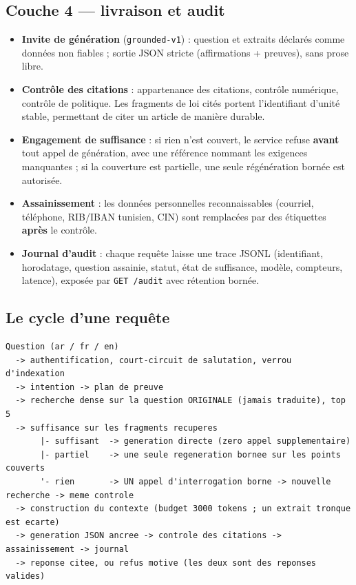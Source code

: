 \documentclass[a4paper,12pt]{report}
\begin{document}
\subsection{Couche 4 — livraison et audit}
\begin{itemize}
  \item \textbf{Invite de génération} (\texttt{grounded-v1}) : question et extraits déclarés comme
        données non fiables ; sortie JSON stricte (affirmations + preuves), sans prose libre.
  \item \textbf{Contrôle des citations} : appartenance des citations, contrôle numérique, contrôle
        de politique. Les fragments de loi cités portent l'identifiant d'unité stable, permettant
        de citer un article de manière durable.
  \item \textbf{Engagement de suffisance} : si rien n'est couvert, le service refuse \textbf{avant}
        tout appel de génération, avec une référence nommant les exigences manquantes ; si la
        couverture est partielle, une seule régénération bornée est autorisée.
  \item \textbf{Assainissement} : les données personnelles reconnaissables (courriel, téléphone,
        RIB/IBAN tunisien, CIN) sont remplacées par des étiquettes \textbf{après} le contrôle.
  \item \textbf{Journal d'audit} : chaque requête laisse une trace JSONL (identifiant, horodatage,
        question assainie, statut, état de suffisance, modèle, compteurs, latence), exposée par
        \texttt{GET /audit} avec rétention bornée.
\end{itemize}

\subsection{Le cycle d'une requête}
\begin{verbatim}
Question (ar / fr / en)
  -> authentification, court-circuit de salutation, verrou d'indexation
  -> intention -> plan de preuve
  -> recherche dense sur la question ORIGINALE (jamais traduite), top 5
  -> suffisance sur les fragments recuperes
       |- suffisant  -> generation directe (zero appel supplementaire)
       |- partiel    -> une seule regeneration bornee sur les points couverts
       '- rien       -> UN appel d'interrogation borne -> nouvelle recherche -> meme controle
  -> construction du contexte (budget 3000 tokens ; un extrait tronque est ecarte)
  -> generation JSON ancree -> controle des citations -> assainissement -> journal
  -> reponse citee, ou refus motive (les deux sont des reponses valides)
\end{verbatim}
\end{document}
